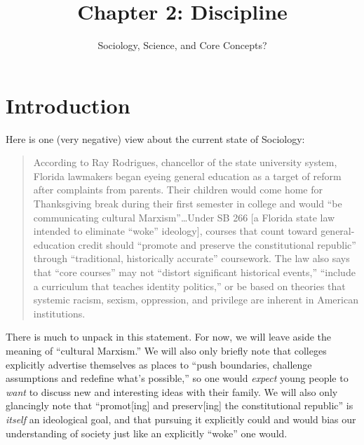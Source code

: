 \documentclass[
  letterpaper,
  DIV=11,
  numbers=noendperiod,
  oneside]{scrartcl}
\title{Chapter 2: Discipline}
\subtitle{Sociology, Science, and Core Concepts?}
\author{}
\date{}
\begin{document}
\maketitle


\section{Introduction}\label{introduction}

Here is one (very negative) view about the current state of Sociology:

\begin{quote}
According to Ray Rodrigues, chancellor of the state university system,
Florida lawmakers began eyeing general education as a target of reform
after complaints from parents. Their children would come home for
Thanksgiving break during their first semester in college and would ``be
communicating cultural Marxism''\ldots Under SB 266 {[}a Florida state
law intended to eliminate ``woke'' ideology{]}, courses that count
toward general-education credit should ``promote and preserve the
constitutional republic'' through ``traditional, historically accurate''
coursework. The law also says that ``core courses'' may not ``distort
significant historical events,'' ``include a curriculum that teaches
identity politics,'' or be based on theories that systemic racism,
sexism, oppression, and privilege are inherent in American
institutions.
\end{quote}

There is much to unpack in this statement. For now, we will leave aside
the meaning of ``cultural Marxism.'' We will also only briefly note that
colleges explicitly advertise themselves as places to ``push boundaries,
challenge assumptions and redefine what's possible,'' so one would
\emph{expect} young people to \emph{want} to discuss new and interesting
ideas with their family. We will also only glancingly note that
``promot{[}ing{]} and preserv{[}ing{]} the constitutional republic'' is
\emph{itself} an ideological goal, and that pursuing it explicitly could
and would bias our understanding of society just like an explicitly
``woke'' one would.
\end{document}
